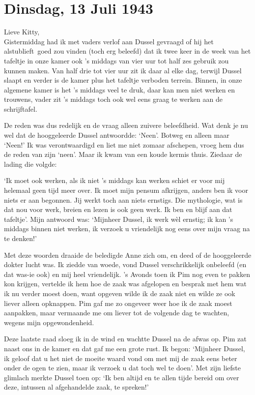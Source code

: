 \documentclass{book}
\begin{document}
\chapter{Dinsdag, 13 Juli 1943}

Lieve Kitty,\\Gistermiddag had ik met vaders verlof aan Dussel gevraagd
of hij het alstublieft~goed zou vinden (toch erg beleefd) dat ik twee
keer in de week van het tafeltje in onze kamer ook 's middags van vier
uur tot half zes gebruik zou kunnen maken. Van half drie tot vier uur
zit ik daar al elke dag, terwijl Dussel slaapt en verder is de kamer
plus het tafeltje verboden terrein. Binnen, in onze algemene kamer is
het 's middags veel te druk, daar kan men niet werken en trouwens, vader
zit 's middags toch ook wel eens graag te werken aan de schrijftafel.

De reden was dus redelijk en de vraag alleen zuivere beleefdheid. Wat
denk je nu wel dat de hooggeleerde Dussel antwoordde: `Neen'. Botweg en
alleen maar `Neen!' Ik was verontwaardigd en liet me niet zomaar
afschepen, vroeg hem dus de reden van zijn `neen'. Maar ik kwam van een
koude kermis thuis. Ziedaar de lading die volgde:

`Ik moet ook werken, als ik niet 's middags kan werken schiet er voor
mij helemaal geen tijd meer over. Ik moet mijn pensum afkrijgen, anders
ben ik voor niets er aan begonnen. Jij werkt toch aan niets ernstigs.
Die mythologie, wat is dat nou voor werk, breien en lezen is ook geen
werk. Ik ben en blijf aan dat tafeltje'. Mijn antwoord was: `Mijnheer
Dussel, ik werk wèl ernstig; ik kan 's middags binnen niet werken, ik
verzoek u vriendelijk nog eens over mijn vraag na te denken!'

Met deze woorden draaide de beledigde Anne zich om, en deed of de
hooggeleerde dokter lucht was. Ik ziedde van woede, vond Dussel
verschrikkelijk onbeleefd (en dat was-ie ook) en mij heel vriendelijk.
's Avonds toen ik Pim nog even te pakken kon krijgen, vertelde ik hem
hoe de zaak was afgelopen en besprak met hem wat ik nu verder moest
doen, want opgeven wilde ik de zaak niet en wilde ze ook liever alleen
opknappen. Pim gaf me zo ongeveer weer hoe ik de zaak moest aanpakken,
maar vermaande me om liever tot de volgende dag te wachten, wegens mijn
opgewondenheid.

Deze laatste raad sloeg ik in de wind en wachtte Dussel na de afwas op.
Pim zat naast ons in de kamer en dat gaf me een grote rust. Ik begon:
`Mijnheer Dussel, ik geloof dat u het niet de moeite waard vond om met
mij de zaak eens beter onder de ogen te zien, maar ik verzoek u dat toch
wel te doen'. Met zijn liefste glimlach merkte Dussel toen op: `Ik ben
altijd en te allen tijde bereid om over deze, intussen al afgehandelde
zaak, te spreken!'
\end{document}
